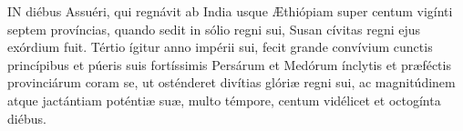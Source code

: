 




\lettrine[lines=2]{I}{N} diébus Assuéri, qui regnávit ab India usque Æthiópiam super centum vigínti septem províncias, quando sedit in sólio regni sui, Susan cívitas regni ejus exórdium fuit. Tértio ígitur anno impérii sui, fecit grande convívium cunctis princípibus et púeris suis fortíssimis Persárum et Medórum ínclytis et præféctis provinciárum coram se, ut osténderet divítias glóriæ regni sui, ac magnitúdinem atque jactántiam poténtiæ suæ, multo témpore, centum vidélicet et octogínta diébus.

